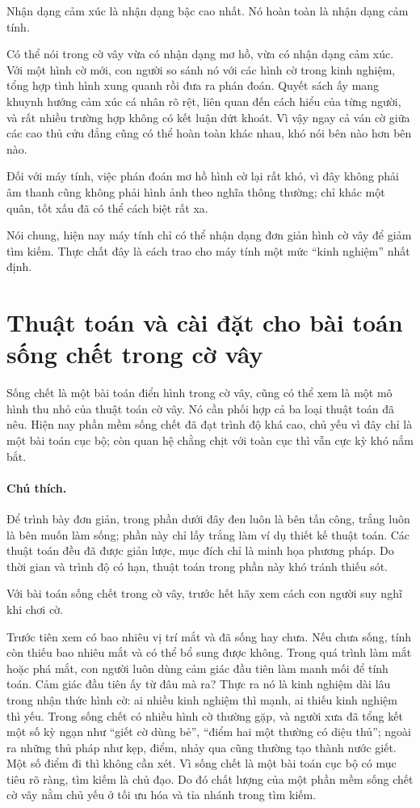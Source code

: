 \documentclass[11pt]{article}
\begin{document}
Nhận dạng cảm xúc là nhận dạng bậc cao nhất. Nó hoàn toàn là nhận dạng cảm
tính.

Có thể nói trong cờ vây vừa có nhận dạng mơ hồ, vừa có nhận dạng cảm xúc. Với
một hình cờ mới, con người so sánh nó với các hình cờ trong kinh nghiệm, tổng
hợp tình hình xung quanh rồi đưa ra phán đoán. Quyết sách ấy mang khuynh
hướng cảm xúc cá nhân rõ rệt, liên quan đến cách hiểu của từng người, và rất
nhiều trường hợp không có kết luận dứt khoát. Vì vậy ngay cả ván cờ giữa các
cao thủ cửu đẳng cũng có thể hoàn toàn khác nhau, khó nói bên nào hơn bên
nào.

Đối với máy tính, việc phán đoán mơ hồ hình cờ lại rất khó, vì đây không phải
âm thanh cũng không phải hình ảnh theo nghĩa thông thường; chỉ khác một quân,
tốt xấu đã có thể cách biệt rất xa.

Nói chung, hiện nay máy tính chỉ có thể nhận dạng đơn giản hình cờ vây để
giảm tìm kiếm. Thực chất đây là cách trao cho máy tính một mức ``kinh
nghiệm'' nhất định.

\section{Thuật toán và cài đặt cho bài toán sống chết trong cờ vây}

Sống chết là một bài toán điển hình trong cờ vây, cũng có thể xem là một mô
hình thu nhỏ của thuật toán cờ vây. Nó cần phối hợp cả ba loại thuật toán đã
nêu. Hiện nay phần mềm sống chết đã đạt trình độ khá cao, chủ yếu vì đây chỉ
là một bài toán cục bộ; còn quan hệ chằng chịt với toàn cục thì vẫn cực kỳ
khó nắm bắt.

\paragraph{Chú thích.}
Để trình bày đơn giản, trong phần dưới đây đen luôn là bên tấn công, trắng
luôn là bên muốn làm sống; phần này chỉ lấy trắng làm ví dụ thiết kế thuật
toán. Các thuật toán đều đã được giản lược, mục đích chỉ là minh họa phương
pháp. Do thời gian và trình độ có hạn, thuật toán trong phần này khó tránh
thiếu sót.

Với bài toán sống chết trong cờ vây, trước hết hãy xem cách con người suy
nghĩ khi chơi cờ.

Trước tiên xem có bao nhiêu vị trí mắt và đã sống hay chưa. Nếu chưa sống,
tính còn thiếu bao nhiêu mắt và có thể bổ sung được không. Trong quá trình
làm mắt hoặc phá mắt, con người luôn dùng cảm giác đầu tiên làm manh mối để
tính toán. Cảm giác đầu tiên ấy từ đâu mà ra? Thực ra nó là kinh nghiệm dài
lâu trong nhận thức hình cờ: ai nhiều kinh nghiệm thì mạnh, ai thiếu kinh
nghiệm thì yếu. Trong sống chết có nhiều hình cờ thường gặp, và người xưa đã
tổng kết một số kỳ ngạn như ``giết cờ dùng bẻ'', ``điểm hai một thường có
diệu thủ''; ngoài ra những thủ pháp như kẹp, điểm, nhảy qua cũng thường tạo
thành nước giết. Một số điểm đi thì không cần xét. Vì sống chết là một bài
toán cục bộ có mục tiêu rõ ràng, tìm kiếm là chủ đạo. Do đó chất lượng của
một phần mềm sống chết cờ vây nằm chủ yếu ở tối ưu hóa và tỉa nhánh trong tìm
kiếm.
\end{document}

